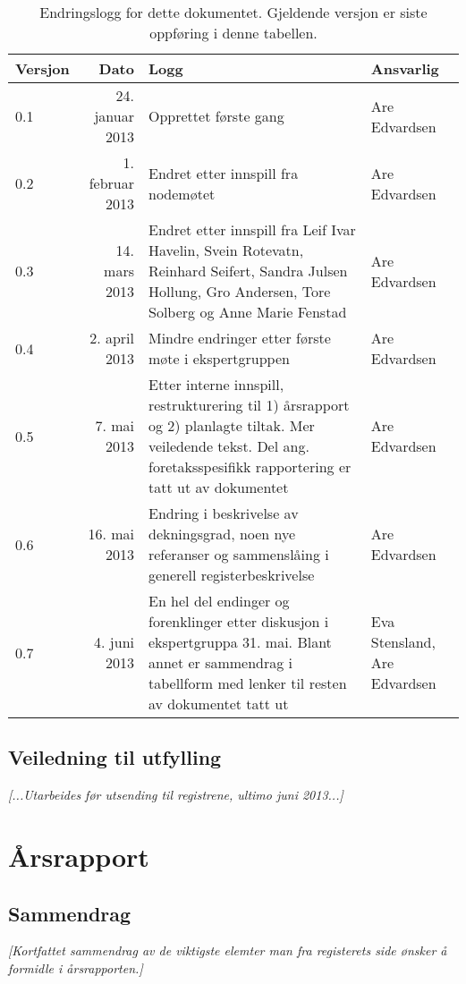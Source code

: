 \documentclass[norsk, a4paper, twocolumn]{report}
\newcommand{\guide}[1] {
	\textit{[\textcolor{guidegray}{#1}]}
	}
\begin{document}
\begin{table}[ht]
  \centering
  \begin{tabular}{lrp{8cm}p{2.5cm}}
    \hline
    Versjon & Dato & Logg & Ansvarlig \\
    \hline
    0.1 & 24. januar 2013 & Opprettet første gang & Are Edvardsen \\
    0.2 & 1. februar 2013 & Endret etter innspill fra nodemøtet &
    Are Edvardsen \\
    0.3 & 14. mars 2013 & Endret etter innspill fra Leif Ivar Havelin,
    Svein Rotevatn,
    Reinhard Seifert, Sandra Julsen Hollung, Gro Andersen, Tore Solberg og
    Anne Marie Fenstad & Are Edvardsen \\
    0.4 & 2. april 2013 & Mindre endringer etter første møte i ekspertgruppen &
    Are Edvardsen \\
    0.5 & 7. mai 2013 & Etter interne innspill, restrukturering til 1)
    årsrapport og 2) planlagte tiltak. Mer veiledende tekst. Del ang.
    foretaksspesifikk rapportering er tatt ut av dokumentet & Are Edvardsen \\
    0.6 & 16. mai 2013 & Endring i beskrivelse av
    dekningsgrad, noen nye referanser og sammenslåing i generell
    registerbeskrivelse & Are Edvardsen \\
    0.7 & 4. juni 2013 & En hel del endinger og forenklinger etter diskusjon i
    ekspertgruppa 31. mai. Blant annet er sammendrag i tabellform med lenker
    til resten av dokumentet tatt ut & Eva Stensland, Are Edvardsen \\
    \hline
  \end{tabular}
  \caption{Endringslogg for dette dokumentet. Gjeldende versjon er siste
  oppføring i denne tabellen.}
  \label{tab:log}
\end{table}


\chapter*{Veiledning til utfylling}
\guide{...Utarbeides før utsending til registrene, ultimo juni 2013...}



\tableofcontents
\part{Årsrapport}\label{par:rap}

\chapter{Sammendrag}
\guide{Kortfattet sammendrag av de viktigste elemter man fra registerets side ønsker å formidle i årsrapporten.}
\end{document}
